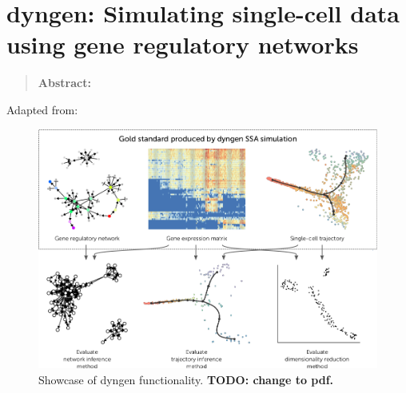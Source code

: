 \newpage{\thispagestyle{empty}\cleardoublepage}
\chapter{dyngen: Simulating single-cell data using gene regulatory networks} 
\label{chap:dyngen}

\begin{quote}
	\textbf{Abstract:} 
\end{quote}

\vfill

Adapted from:\\

\newpage



\begin{figure}
	\centering
	\includegraphics[width=\LARGEfigure]{fig/dyngen/showcase_2.png} 
	\caption{Showcase of dyngen functionality. \textbf{TODO: change to pdf.}} %
	\label{fig:dyngen}
\end{figure}